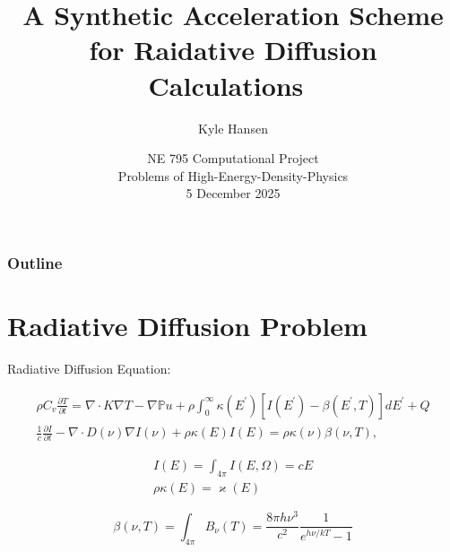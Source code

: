 \documentclass{beamer}
\title[Radiative Diffusion Acceleration]{A Synthetic Acceleration Scheme for Raidative Diffusion Calculations~\cite{morel1985synthetic}}
\author[K. Hansen]{Kyle Hansen}
\institute[NCSU]{North Carolina State University}
\date[5 December 2025]{NE 795 Computational Project\\Problems of High-Energy-Density-Physics\\5 December 2025}
\begin{document}
\frame{\titlepage}

\begin{frame}
    \frametitle{Outline}
    \tableofcontents
    
\end{frame}

\section{Radiative Diffusion Problem}

\begin{frame}

    Radiative Diffusion Equation:

    \begin{gather}
        \label{eq:spectral_temperature}
        \rho C_v \frac{\partial T}{\partial t} = \nabla \cdot K \nabla T - \nabla {\mathbb{P}u} + \rho \int_0^\infty \kappa(E^\prime)\left[ I(E^\prime) - \beta(E^\prime, T) \right] dE^\prime + Q\\
        \label{eq:spectral_diffusion}
        \frac{1}{c}\frac{\partial I}{\partial t} - \nabla \cdot D(\nu) \nabla I(\nu) + \rho \kappa(E)I(E) = \rho\kappa(\nu)\beta(\nu, T), 
    \end{gather}

    \begin{gather}
        I(E) = \int_{4\pi} I(E, \Omega) = cE\\
        \rho \kappa(E) = \varkappa(E)
    \end{gather}

    \begin{equation}
        \beta(\nu, T) = \int_{4\pi} B_\nu(T) = \frac{8\pi h \nu^3}{c^2}\frac{1}{e^{h\nu/kT} - 1}
    \end{equation}

        
\end{frame}
\end{document}
